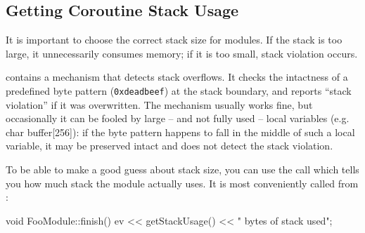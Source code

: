 %
%
%
%





\subsection{Getting Coroutine Stack Usage}

It is important to choose the correct stack size for
modules.  If the stack is
too large, it unnecessarily consumes memory; if it is too small, stack
violation occurs.

{\opp} contains a mechanism that detects stack
overflows. It checks the intactness of a
predefined byte pattern (\texttt{0xdeadbeef}) at the stack boundary,
and reports ``stack violation'' if it was
overwritten. The mechanism usually works fine, but occasionally it can
be fooled by large -- and not fully used -- local variables (e.g. char
buffer[256]): if the byte pattern happens to fall in the middle of
such a local variable, it may be preserved intact and {\opp} does not
detect the stack violation.

To be able to make a good guess about stack size, you can use
the  call which tells you how much stack the module
actually uses. It is most conveniently called from :

\begin{cpp}
void FooModule::finish()
{
  ev << getStackUsage() << " bytes of stack used\n";
}
\end{cpp}


